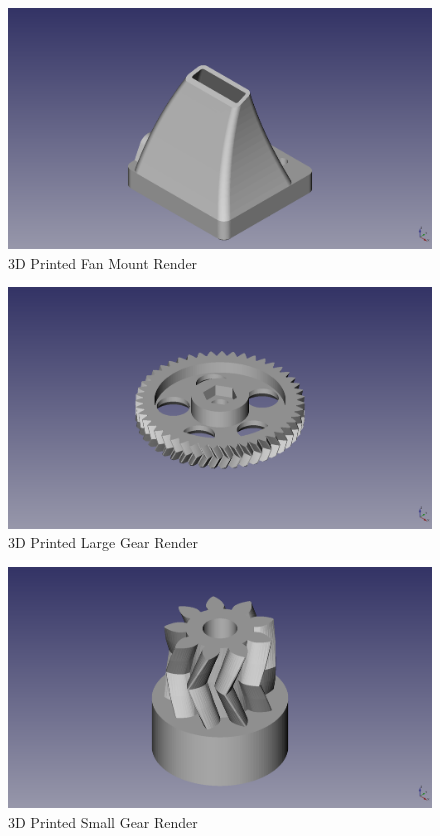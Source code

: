\begin{figure}[H]
\centering
\includegraphics[keepaspectratio=true,angle=0,height=1.0\textheight,width=1.0\textwidth]{STL/fanmount.stl.png}
\caption{3D Printed Fan Mount Render}
\label{fig:fanmountrender}
\end{figure}

\begin{figure}[H]
\centering
\includegraphics[keepaspectratio=true,angle=0,height=1.0\textheight,width=1.0\textwidth]{STL/gearlarge.stl.png}
\caption{3D Printed Large Gear Render}
\label{fig:gearlargerender}
\end{figure}

\begin{figure}[H]
\centering
\includegraphics[keepaspectratio=true,angle=0,height=1.0\textheight,width=1.0\textwidth]{STL/gearsmall.stl.png}
\caption{3D Printed Small Gear Render}
\label{fig:gearsmallrender}
\end{figure}

